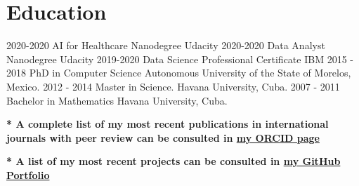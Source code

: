 \documentclass[]{friggeri-cv}
\begin{document}
\section{Education}
\begin{entrylist}\vspace{-.1in}
\entry
    {2020-2020}
    { AI for Healthcare Nanodegree}
    {Udacity}  {}\vspace{-.1in}
    \entry
    {2020-2020}
    { Data Analyst Nanodegree}
    {Udacity}  {}\vspace{-.1in}
\entry
    {2019-2020}
    { Data Science Professional Certificate}
    {IBM}  {}\vspace{-.1in}
\entry  
    {2015 - 2018}
    {PhD in Computer Science}
    {Autonomous University of the State of Morelos, Mexico.}  {}\vspace{-.1in}
  \entry
    {2012 - 2014}
    {Master in Science.}
    {Havana University, Cuba.}{}
  \entry
    {2007 - 2011}
    {Bachelor in Mathematics}
    {Havana University,
    Cuba.}
     {}
\end{entrylist}

\textbf{* A complete list of my most recent publications in international journals with peer review can be  consulted in \href{https://orcid.org/0000-0001-6005-0702/}{my ORCID page}}

\textbf{* A  list of my most recent projects  can be  consulted in  \href{https://claudia-perez-ruisanchez.github.io/portfolio}{my GitHub Portfolio}}
\end{document}
